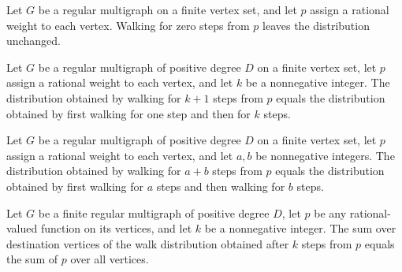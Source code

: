 \begin{theorem}
\label{Randomized.RegularMultigraph.walkDist_zero}
\leanok
{}
Let $G$ be a regular multigraph on a finite vertex set, and let $p$ assign a rational
weight to each vertex. Walking for zero steps from $p$ leaves the distribution
unchanged.
\end{theorem}

\begin{theorem}
\label{Randomized.RegularMultigraph.walkDist_succ}
\leanok
{}
Let $G$ be a regular multigraph of positive degree $D$ on a finite vertex set, let $p$
assign a rational weight to each vertex, and let $k$ be a nonnegative integer. The
distribution obtained by walking for $k+1$ steps from $p$ equals the distribution
obtained by first walking for one step and then for $k$ steps.
\end{theorem}

\begin{theorem}
\label{Randomized.RegularMultigraph.walkDist_add}
\leanok
{}
Let $G$ be a regular multigraph of positive degree $D$ on a finite vertex set, let $p$
assign a rational weight to each vertex, and let $a,b$ be nonnegative integers. The
distribution obtained by walking for $a+b$ steps from $p$ equals the distribution
obtained by first walking for $a$ steps and then walking for $b$ steps.
\end{theorem}

\begin{theorem}
\label{Randomized.RegularMultigraph.sum_walkDist}
\leanok
{}
Let $G$ be a finite regular multigraph of positive degree $D$, let $p$ be any
rational-valued function on its vertices, and let $k$ be a nonnegative integer. The sum
over destination vertices of the walk distribution obtained after $k$ steps from $p$
equals the sum of $p$ over all vertices.
\end{theorem}

